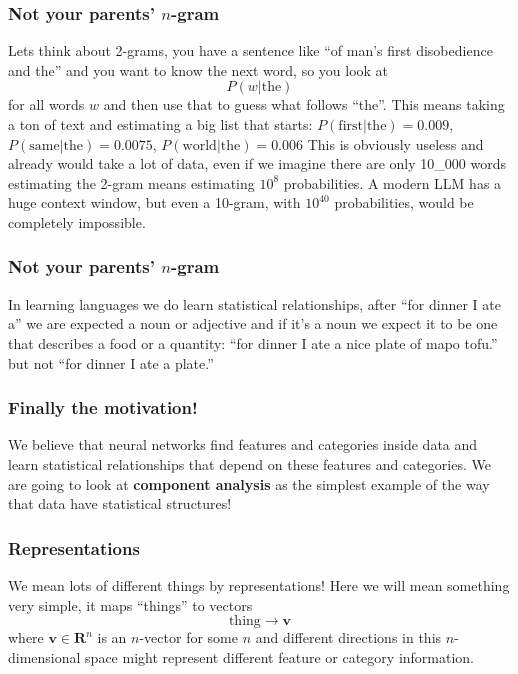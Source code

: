 \documentclass{beamer}
\begin{document}
\begin{frame}
\frametitle{Not your parents' $n$-gram}
\vskip 0.25cm
Lets think about 2-grams, you have a sentence like ``of man's first disobedience and the'' and you want to know the next word, so you look at
$$
P(w|\text{the})
$$
for all words $w$ and then use that to guess what follows ``the''. This means taking a ton of text and estimating a big list that starts: 
\vskip 0.25cm
$P(\text{first}|\text{the}) = 0.009$, $P(\text{same}|\text{the}) = 0.0075$, $P(\text{world}|\text{the}) = 0.006$
\vskip 0.25cm
This is obviously useless and already would take a lot of data, even if we imagine there are only 10\_000 words estimating the 2-gram means estimating $10^8$ probabilities. A modern LLM has a huge context window, but even a 10-gram, with $10^40$ probabilities, would be completely impossible.
\end{frame}

\begin{frame}
\frametitle{Not your parents' $n$-gram}
\vskip 0.25cm
In learning languages we do learn statistical relationships, after
\vskip 0.25cm
``for dinner I ate a'' 
\vskip 0.25cm
we are expected a noun or adjective and if it's a noun we expect it to be one that describes a food or a quantity: 
\vskip 0.25cm
``for dinner I ate a nice plate of mapo tofu.'' 
\vskip 0.25cm
but not  
\vskip 0.25cm
``for dinner I ate a plate.''
\end{frame}

\begin{frame}
\frametitle{Finally the motivation!}
\vskip 0.25cm
We believe that neural networks find features and categories inside data and learn statistical relationships that depend on these features and categories.
\vskip 0.25cm
We are going to look at \textbf{component analysis} as the simplest example of the way that data have statistical structures!
\end{frame}

\begin{frame}
\frametitle{Representations}
\vskip 0.25cm
We mean lots of different things by representations! Here we will mean something very simple, it maps ``things'' to vectors
$$
\text{thing}\rightarrow \mathbf{v}
$$
where $\mathbf{v}\in \mathbf{R}^n$ is an $n$-vector for some $n$ and different directions in this $n$-dimensional space might represent different feature or category information.
\end{frame}
\end{document}
